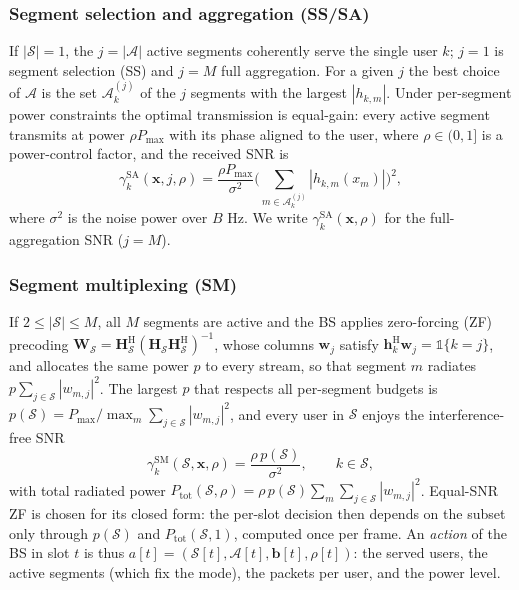 \documentclass[journal]{IEEEtran}
\newcommand{\Pmax}{P_{\max}}
\newcommand{\vect}[1]{\bm{#1}}
\newcommand{\Sset}{\mathcal{S}}
\begin{document}
\subsubsection{Segment selection and aggregation (SS/SA)} If $|\Sset|=1$, the $j=|\mathcal A|$ active segments coherently serve the single user $k$; $j=1$ is segment selection (SS) and $j=M$ full aggregation. For a given $j$ the best choice of $\mathcal A$ is the set $\mathcal A_k^{(j)}$ of the $j$ segments with the largest $|h_{k,m}|$. Under per-segment power constraints the optimal transmission is equal-gain: every active segment transmits at power $\rho\Pmax$ with its phase aligned to the user, where $\rho\in(0,1]$ is a power-control factor, and the received SNR is
\begin{equation}\label{eq:snr_sa}
\gamma_k^{\mathrm{SA}}(\vect x,j,\rho)=\frac{\rho\Pmax}{\sigma^2}\Big(\sum_{m\in\mathcal A_k^{(j)}}|h_{k,m}(x_m)|\Big)^2,
\end{equation}
where $\sigma^2$ is the noise power over $B$ Hz. We write $\gamma_k^{\mathrm{SA}}(\vect x,\rho)$ for the full-aggregation SNR ($j=M$).

\subsubsection{Segment multiplexing (SM)} If $2\le|\Sset|\le M$, all $M$ segments are active and the BS applies zero-forcing (ZF) precoding $\vect W_{\Sset}=\vect H_{\Sset}^{\mathrm H}(\vect H_{\Sset}\vect H_{\Sset}^{\mathrm H})^{-1}$, whose columns $\vect w_j$ satisfy $\vect h_k^{\mathrm H}\vect w_j=\mathbb 1\{k=j\}$, and allocates the same power $p$ to every stream, so that segment $m$ radiates $p\sum_{j\in\Sset}|w_{m,j}|^2$. The largest $p$ that respects all per-segment budgets is $p(\Sset)=\Pmax/\max_m\sum_{j\in\Sset}|w_{m,j}|^2$, and every user in $\Sset$ enjoys the interference-free SNR
\begin{equation}\label{eq:snr_sm}
\gamma_k^{\mathrm{SM}}(\Sset,\vect x,\rho)=\frac{\rho\,p(\Sset)}{\sigma^2},\qquad k\in\Sset,
\end{equation}
with total radiated power $P_{\mathrm{tot}}(\Sset,\rho)=\rho\,p(\Sset)\sum_{m}\sum_{j\in\Sset}|w_{m,j}|^2$. Equal-SNR ZF is chosen for its closed form: the per-slot decision then depends on the subset only through $p(\Sset)$ and $P_{\mathrm{tot}}(\Sset,1)$, computed once per frame. An \emph{action} of the BS in slot $t$ is thus $a[t]=(\Sset[t],\mathcal A[t],\vect b[t],\rho[t])$: the served users, the active segments (which fix the mode), the packets per user, and the power level.
\end{document}
